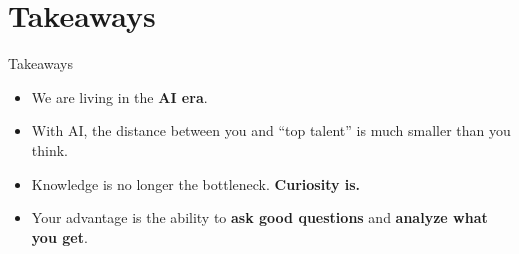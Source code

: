 
\section{Takeaways}

\begin{frame}{Takeaways}


\begin{itemize}
  \item We are living in the \textbf{AI era}.
  \item With AI, the distance between you and “top talent” is much smaller than you think.
  \item Knowledge is no longer the bottleneck. \textbf{Curiosity is.}
  \item Your advantage is the ability to \textbf{ask good questions} and \textbf{analyze what you get}.
\end{itemize}

\vspace{0.8em}
\centering
\LARGE


\end{frame}